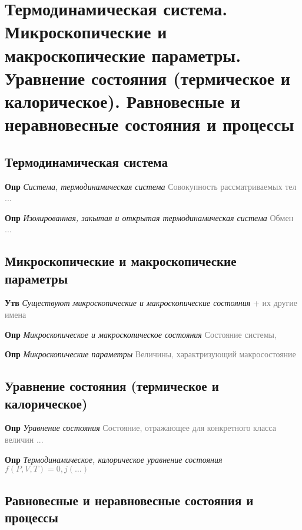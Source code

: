 \documentclass[a4paper, 14pt]{article}
\begin{document}
    \tableofcontents \newpage

    \section{Термодинамическая система.
    Микроскопические и макроскопические параметры.
    Уравнение состояния (термическое и калорическое).
    Равновесные и неравновесные состояния и процессы}

    \subsection{Термодинамическая система}

    \textbf{Опр} \textit{Система, термодинамическая система} \textcolor{gray}{Совокупность рассматриваемых тел ...}

    \textbf{Опр} \textit{Изолированная, закытая и открытая термодинамическая система} \textcolor{gray}{Обмен ...}

    \subsection{Микроскопические и макроскопические параметры}

    \textbf{Утв} \textit{Существуют микроскопические и макроскопические состояния} \textcolor{gray}{+ их другие имена}

    \textbf{Опр} \textit{Микроскопическое и макроскопическое состояния} \textcolor{gray}{Состояние системы,}

    \textbf{Опр} \textit{Микроскопические параметры} \textcolor{gray}{Величины, характризующий макросостояние}

    \subsection{Уравнение состояния (термическое и калорическое)}

    \textbf{Опр} \textit{Уравнение состояния} \textcolor{gray}{Состояние, отражающее для конкретного класса величин ...}

    \textbf{Опр} \textit{Термодинамическое, калорическое уравнение состояния} \textcolor{gray}{$f(P, V, T) = 0, j(\dots)$}

    \subsection{Равновесные и неравновесные состояния и процессы}
\end{document}

